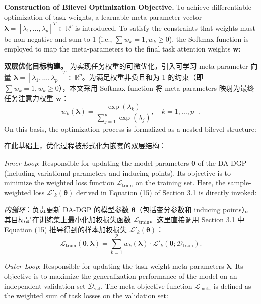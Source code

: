 \documentclass[11pt]{article}
\begin{document}
\textbf{Construction of Bilevel Optimization Objective.} To achieve differentiable optimization of task weights, a learnable meta-parameter vector $\boldsymbol{\lambda} = [\lambda_1, \ldots, \lambda_p]^T \in \mathbb{R}^p$ is introduced. To satisfy the constraints that weights must be non-negative and sum to 1 (i.e., $\sum w_k = 1, w_k \ge 0$), the Softmax function is employed to map the meta-parameters to the final task attention weights $\mathbf{w}$:

\textbf{双层优化目标构建。} 为实现任务权重的可微优化，引入可学习 meta-parameter 向量 $\boldsymbol{\lambda} = [\lambda_1, \ldots, \lambda_p]^T \in \mathbb{R}^p$。为满足权重非负且和为 1 的约束（即 $\sum w_k = 1, w_k \ge 0$），本文采用 Softmax function 将 meta-parameters 映射为最终任务注意力权重 $\mathbf{w}$：
\begin{equation}
	{{w}_{k}}(\boldsymbol{\lambda })=\frac{\exp ({{\lambda }_{k}})}{\sum\limits_{j=1}^{p}{\exp }({{\lambda }_{j}})},\quad k=1,\ldots ,p\text{ }.
\end{equation}
On this basis, the optimization process is formalized as a nested bilevel structure:

在此基础上，优化过程被形式化为嵌套的双层结构：

\textit{Inner Loop}: Responsible for updating the model parameters $\boldsymbol{\theta}$ of the DA-DGP (including variational parameters and inducing points). Its objective is to minimize the weighted loss function $\mathcal{L}_{\text{train}}$ on the training set. Here, the sample-weighted loss $\mathcal{L}'_k(\boldsymbol{\theta})$ derived in Equation (15) of Section 3.1 is directly invoked:

\textit{内循环}：负责更新 DA-DGP 的模型参数 $\boldsymbol{\theta}$（包括变分参数和 inducing points）。其目标是在训练集上最小化加权损失函数 $\mathcal{L}_{\text{train}}$。这里直接调用 Section 3.1 中 Equation (15) 推导得到的样本加权损失 $\mathcal{L}'_k(\boldsymbol{\theta})$：
\begin{equation}
	{{\mathcal{L}}_{\text{train}}}(\boldsymbol{\theta },\boldsymbol{\lambda })=\sum\limits_{k=1}^{p}{{{w}_{k}}}(\boldsymbol{\lambda })\cdot {{{\mathcal{L}}'}_{k}}(\boldsymbol{\theta };{{\mathcal{D}}_{\text{train}}}).
\end{equation}

\textit{Outer Loop}: Responsible for updating the task weight meta-parameters $\boldsymbol{\lambda}$. Its objective is to maximize the generalization performance of the model on an independent validation set $\mathcal{D}_{\text{val}}$. The meta-objective function $\mathcal{L}_{\text{meta}}$ is defined as the weighted sum of task losses on the validation set:
\end{document}
